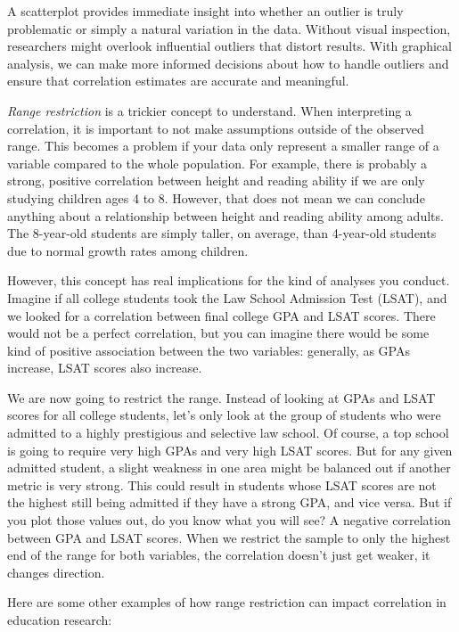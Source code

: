 \documentclass[
  letterpaper,
  DIV=11,
  numbers=noendperiod]{scrreprt}
\begin{document}
A scatterplot provides immediate insight into whether an outlier is
truly problematic or simply a natural variation in the data. Without
visual inspection, researchers might overlook influential outliers that
distort results. With graphical analysis, we can make more informed
decisions about how to handle outliers and ensure that correlation
estimates are accurate and meaningful.

\emph{Range restriction} is a trickier concept to understand. When
interpreting a correlation, it is important to not make assumptions
outside of the observed range. This becomes a problem if your data only
represent a smaller range of a variable compared to the whole
population. For example, there is probably a strong, positive
correlation between height and reading ability if we are only studying
children ages 4 to 8. However, that does not mean we can conclude
anything about a relationship between height and reading ability among
adults. The 8-year-old students are simply taller, on average, than
4-year-old students due to normal growth rates among children.

However, this concept has real implications for the kind of analyses you
conduct. Imagine if all college students took the Law School Admission
Test (LSAT), and we looked for a correlation between final college GPA
and LSAT scores. There would not be a perfect correlation, but you can
imagine there would be some kind of positive association between the two
variables: generally, as GPAs increase, LSAT scores also increase.

We are now going to restrict the range. Instead of looking at GPAs and
LSAT scores for all college students, let's only look at the group of
students who were admitted to a highly prestigious and selective law
school. Of course, a top school is going to require very high GPAs and
very high LSAT scores. But for any given admitted student, a slight
weakness in one area might be balanced out if another metric is very
strong. This could result in students whose LSAT scores are not the
highest still being admitted if they have a strong GPA, and vice versa.
But if you plot those values out, do you know what you will see? A
negative correlation between GPA and LSAT scores. When we restrict the
sample to only the highest end of the range for both variables, the
correlation doesn't just get weaker, it changes direction.

Here are some other examples of how range restriction can impact
correlation in education research:
\end{document}
